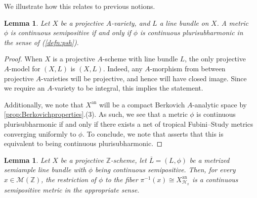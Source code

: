 \documentclass[11pt,reqno]{amsart}
\newcommand{\mZ}{\mathbb{Z}}
\newcommand{\sH}{{\mathscr H}}
\newcommand{\sM}{{\mathscr M}}
\theoremstyle{theorem}
\numberwithin{equation}{subsection}
\newtheorem{lemma}[subsubsection]{Lemma}
\numberwithin{equation}{subsection}
\theoremstyle{definition}
\theoremstyle{remark}
\numberwithin{equation}{subsubsection} \numberwithin{figure}{section}
\DeclareMathOperator{\an}{an}
\begin{document}
We illustrate how this relates to previous notions.

\begin{lemma}\label{lemma:proj_continuoussemipositive_continuouspsh}
Let $X$ be a projective $A$-variety, and $L$ a line bundle on $X$. 
A metric $\phi$ is continuous semipositive if and only if $\phi$ is continuous plurisubharmonic in the sense of \cite{PilleSchneider:Global} (\autoref{defn:psh}). 
\end{lemma}

\begin{proof}
When $X$ is a projective $A$-scheme with line bundle $L$, the only projective $A$-model for $(X,L)$ is $(X,L)$. 
Indeed, any $A$-morphism from between projective $A$-varieties will be projective, and hence will have closed image. 
Since we require an $A$-variety to be integral, this implies the statement. 


Additionally, we note that $X^{\an}$ will be a compact Berkovich $A$-analytic space by \autoref{prop:Berkovichproperties}.(3). 
As such, we see that a metric $\phi$ is continuous plurisubharmonic if and only if there exists a net of tropical Fubini--Study metrics converging uniformly to $\phi$. 
To conclude, we note that \cite[Proposition 2.21]{PilleSchneider:Global} asserts that this is equivalent to being continuous plurisubharmonic.
\end{proof}

\begin{lemma}\label{lemma:proj_restrictedcontinuoussemipositive}
Let $X$ be a projective $\mZ$-scheme, let $\overline{L} = (L,\phi)$ be a metrized semiample line bundle with $\phi$ being continuous semipositive. 
Then, for every $x\in \sM(\mZ)$, the restriction of $\phi$ to the fiber $\pi^{-1}(x)\cong X^{\an}_{\sH_x}$ is a continuous semipositive metric in the appropriate sense. 
\end{lemma}
\end{document}
